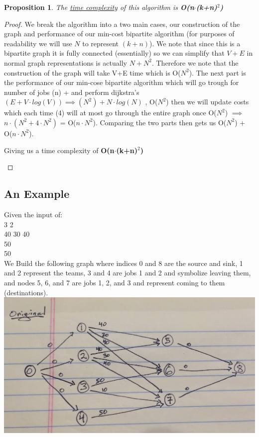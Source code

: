 \documentclass[12pt]{article}
\newtheorem{proposition}[theorem]{Proposition}
\begin{document}
\begin{proposition}
\label{numq}
The \underline{time complexity} of this algorithm is \textbf{O(n$\cdot$(k+n)$^2$)}
\end{proposition}

\begin{proof}
We break the algorithm into a two main cases, our construction of the graph and performance of our min-cost
bipartite algorithm (for purposes of readability we will use $N$ to represent $(k+n)$). We note that since
this is a bipartite graph it is fully connected (essentially) so we can simplify that $V + E$ in normal
graph representations is actually $N + N^2$. Therefore we note that the construction of the graph will
take V+E time which is O($N^2$). The next part is the performance of our min-cose bipartite algorithm which
will go trough for number of jobs (n) + and perform dijkstra's $(E + V\cdot log(V)) \implies (N^2) + N\cdot log(N)$
, O($N^2$) then we will update costs which each time (4) will at most go through the entire graph once O($N^2$)
$\implies$ $n\cdot (N^2 + 4\cdot N^2)$ = O($n \cdot N^2$). Comparing the two parts then gets us O($N^2$) +
O($n \cdot N^2$).
\begin{center}
    Giving us a time complexity of \textbf{O(n$\cdot$(k+n)$^2$)}
\end{center}
\end{proof}


\subsection{An Example}
Given the input of: \\
3 2 \\
40 30 40 \\
50 \\
50 \\

We Build the following graph where indices 0 and 8 are the source and sink, 1 and 2 represent the
teams, 3 and 4 are jobs 1 and 2 and symbolize leaving them, and nodes 5, 6, and 7 are jobs 1, 2, and 3
and represent coming to them (destinations). \\
\includegraphics[width=\textwidth]{ExampleCpart1} \\
\end{document}
